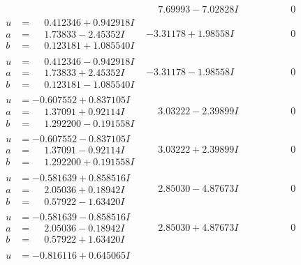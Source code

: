 \documentclass[1p]{elsarticle_modified}
\theoremstyle{definition}
\begin{document}
$$\begin{array}{c|c|c}
 & \phantom{-}7.69993 - 7.02828 I & \phantom{-0.000000 } 0 \\ \hline\begin{aligned}
u &= \phantom{-}0.412346 + 0.942918 I \\
a &= \phantom{-}1.73833 - 2.45352 I \\
b &= \phantom{-}0.123181 + 1.085540 I\end{aligned}
 & -3.31178 + 1.98558 I & \phantom{-0.000000 } 0 \\ \hline\begin{aligned}
u &= \phantom{-}0.412346 - 0.942918 I \\
a &= \phantom{-}1.73833 + 2.45352 I \\
b &= \phantom{-}0.123181 - 1.085540 I\end{aligned}
 & -3.31178 - 1.98558 I & \phantom{-0.000000 } 0 \\ \hline\begin{aligned}
u &= -0.607552 + 0.837105 I \\
a &= \phantom{-}1.37091 + 0.92114 I \\
b &= \phantom{-}1.292200 - 0.191558 I\end{aligned}
 & \phantom{-}3.03222 - 2.39899 I & \phantom{-0.000000 } 0 \\ \hline\begin{aligned}
u &= -0.607552 - 0.837105 I \\
a &= \phantom{-}1.37091 - 0.92114 I \\
b &= \phantom{-}1.292200 + 0.191558 I\end{aligned}
 & \phantom{-}3.03222 + 2.39899 I & \phantom{-0.000000 } 0 \\ \hline\begin{aligned}
u &= -0.581639 + 0.858516 I \\
a &= \phantom{-}2.05036 + 0.18942 I \\
b &= \phantom{-}0.57922 - 1.63420 I\end{aligned}
 & \phantom{-}2.85030 - 4.87673 I & \phantom{-0.000000 } 0 \\ \hline\begin{aligned}
u &= -0.581639 - 0.858516 I \\
a &= \phantom{-}2.05036 - 0.18942 I \\
b &= \phantom{-}0.57922 + 1.63420 I\end{aligned}
 & \phantom{-}2.85030 + 4.87673 I & \phantom{-0.000000 } 0 \\ \hline\begin{aligned}
u &= -0.816116 + 0.645065 I \\

\end{aligned}
\end{array}$$
\end{document}
